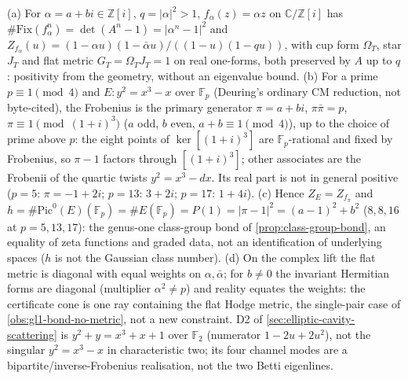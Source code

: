 \begin{theorem}
\label{thm:cm-torus-class-group-bond}
(a) For $\alpha = a+bi\in\mathbb Z[i]$, $q = |\alpha|^2>1$, $f_\alpha(z) = \alpha z$ on $\mathbb C/\mathbb Z[i]$ has
$\#\mathrm{Fix}(f_\alpha^n) = \det(A^n-1) = |\alpha^n-1|^2$ and $Z_{f_\alpha}(u) = (1-\alpha u)(1-\bar\alpha u)/((1-u)(1-qu))$, with cup
form $\Omega_T$, star $J_T$ and flat metric $G_T = \Omega_TJ_T = 1$ on real one-forms, both preserved by $A$ up to $q$: positivity %
from the geometry, without an eigenvalue bound. (b) For a prime $p\equiv1\pmod4$ and $E: y^2 = x^3-x$ over $\mathbb F_p$
(Deuring's ordinary CM reduction, not byte-cited), the Frobenius is the primary generator $\pi = a+bi$, $\pi\bar\pi = p$,
$\pi\equiv1\pmod{(1+i)^3}$ ($a$ odd, $b$ even, $a+b\equiv1\pmod4$), up to the choice of prime above $p$: the eight points of
$\ker[(1+i)^3]$ are $\mathbb F_p$-rational and fixed by Frobenius, so $\pi-1$ factors through $[(1+i)^3]$; other associates are
the Frobenii of the quartic twists $y^2 = x^3-dx$. Its real part is not in general positive ($p = 5$: $\pi = -1+2i$;
$p = 13$: $3+2i$; $p = 17$: $1+4i$). (c) Hence $Z_E = Z_{f_\pi}$ and $h = \#\mathrm{Pic}^0(E)(\mathbb F_p) = \#E(\mathbb F_p) = P(1) =
|\pi-1|^2 = (a-1)^2+b^2$ ($8, 8, 16$ at $p = 5,13,17$): the genus-one class-group bond of \cref{prop:class-group-bond}, an equality of
zeta functions and graded data, not an identification of underlying spaces ($h$ is not the Gaussian class number).
(d) On the complex lift the flat metric is diagonal with equal weights on $\alpha,\bar\alpha$; for $b\ne0$ the invariant
Hermitian forms are diagonal (multiplier $\alpha^2\ne p$) and reality equates the weights: the certificate cone is one
ray containing the flat Hodge metric, the single-pair case of \cref{obs:gl1-bond-no-metric}, not a new constraint. D2 of
\cref{sec:elliptic-cavity-scattering} is $y^2+y = x^3+x+1$ over $\mathbb F_2$ (numerator $1-2u+2u^2$), not the singular
$y^2 = x^3-x$ in characteristic two; its four channel modes are a bipartite/inverse-Frobenius realisation, not the two
Betti eigenlines.
\end{theorem}

